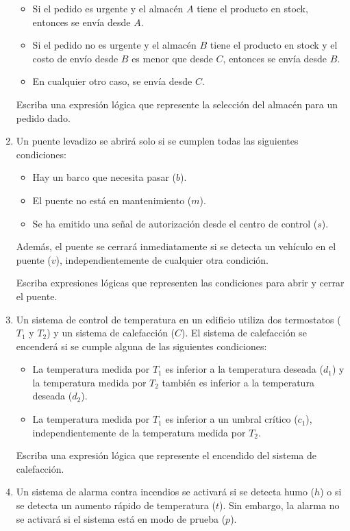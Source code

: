 \begin{enumerate}[label=\textbf{\arabic*}.]
	\begin{itemize}[itemsep=-3pt]
		\item Si el pedido es urgente y el almacén $A$ tiene el producto en stock, entonces se envía desde $A$.
		\item Si el pedido no es urgente y el almacén $B$ tiene el producto en stock y el costo de envío desde $B$ es menor que desde $C$, entonces se envía desde $B$.
		\item En cualquier otro caso, se envía desde $C$.
	\end{itemize}
	Escriba una expresión lógica que represente la selección del almacén para un pedido dado.
	
	\item Un puente levadizo se abrirá solo si se cumplen todas las siguientes condiciones:
	
	\begin{itemize}[itemsep=-3pt]
		\item Hay un barco que necesita pasar ($b$).
		\item El puente no está en mantenimiento ($m$).
		\item Se ha emitido una señal de autorización desde el centro de control ($s$).
	\end{itemize}	
	Además, el puente se cerrará inmediatamente si se detecta un vehículo en el puente ($v$), independientemente de cualquier otra condición.
	
	Escriba expresiones lógicas que representen las condiciones para abrir y cerrar el puente.
	
	\item Un sistema de control de temperatura en un edificio utiliza dos termostatos ($T_1$ y $T_2$) y un sistema de calefacción ($C$). El sistema de calefacción se encenderá si se cumple alguna de las siguientes condiciones:
	\begin{itemize}[itemsep=-3pt]
		\item La temperatura medida por $T_1$ es inferior a la temperatura deseada ($d_1$) y la temperatura medida por $T_2$ también es inferior a la temperatura deseada ($d_2$).
		\item La temperatura medida por $T_1$ es inferior a un umbral crítico ($c_1$), independientemente de la temperatura medida por $T_2$.
	\end{itemize}	
	Escriba una expresión lógica que represente el encendido del sistema de calefacción.
	
	\item Un sistema de alarma contra incendios se activará si se detecta humo ($h$) o si se detecta un aumento rápido de temperatura ($t$). Sin embargo, la alarma no se activará si el sistema está en modo de prueba ($p$).
	

\end{enumerate}
